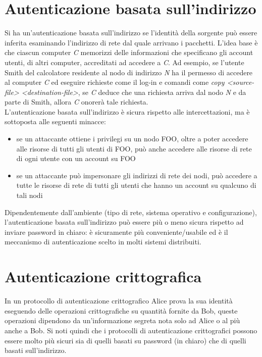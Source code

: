 \section{Autenticazione basata sull'indirizzo}
Si ha un'autenticazione basata sull'indirizzo se l'identità della sorgente può essere inferita esaminando l'indirizzo di rete dal quale arrivano i pacchetti. L'idea base è che ciascun computer \textit{C} memorizzi delle informazioni che specificano gli account utenti, di altri computer, accreditati ad accedere a \textit{C}. Ad esempio, se l'utente Smith del calcolatore residente al nodo di indirizzo \textit{N} ha il permesso di accedere al computer \textit{C} ed eseguire richieste come il log-in e comandi come \textit{copy <source-file> <destination-file>}, se \textit{C} deduce che una richiesta arriva dal nodo \textit{N} e da parte di Smith, allora \textit{C} onorerà tale richiesta.\\

L'autenticazione basata sull'indirizzo è sicura rispetto alle intercettazioni, ma è sottoposta alle seguenti minacce:
\begin{itemize}
\item se un attaccante ottiene i privilegi su un nodo FOO, oltre a poter accedere alle risorse di tutti gli utenti di FOO, può anche accedere alle risorse di rete di ogni utente con un account su FOO
\item se un attaccante può impersonare gli indirizzi di rete dei nodi, può accedere a tutte le risorse di rete di tutti gli utenti che hanno un account su qualcuno di tali nodi
\end{itemize}
Dipendentemente dall'ambiente (tipo di rete, sistema operativo e configurazione), l'autenticazione basata sull'indirizzo può essere più o meno sicura rispetto ad inviare password in chiaro: è sicuramente più conveniente/usabile ed è il meccanismo di autenticazione scelto in molti sistemi distribuiti.

\section{Autenticazione crittografica}
In un protocollo di autenticazione crittografico Alice prova la sua identità eseguendo delle operazioni crittografiche su quantità fornite da Bob, queste operazioni dipendono da un'informazione segreta nota solo ad Alice o al più anche a Bob. Si noti quindi che i protocolli di autenticazione crittografici possono essere molto più sicuri sia di quelli basati su password (in chiaro) che di quelli basati sull'indirizzo. 

